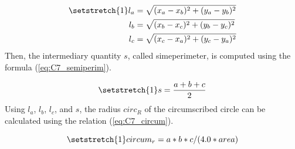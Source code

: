 \begin{align*}
    \setstretch{1}
    l_a &= \sqrt{(x_a - x_b)^2 + (y_a - y_b)^2}\\
    l_b &= \sqrt{(x_b - x_c)^2 + (y_b - y_c)^2}\\
    l_c &= \sqrt{(x_c - x_a)^2 + (y_c - y_a)^2}
\end{align*}
Then, the intermediary quantity $s$, called simeperimeter, is computed using the formula (\ref{eq:C7_semiperim}).

\begin{equation}
    \setstretch{1}
    s = \frac{a + b + c}{2}\label{eq:C7_semiperim}
\end{equation}
Using $l_a$, $l_b$, $l_c$, and $s$, the radius $circ_R$ of the circumscribed circle can be calculated using the relation (\ref{eq:C7_circum}). 

\begin{equation}
    \setstretch{1}
   circum_r = a * b * c / (4.0 * area)
\end{equation}
